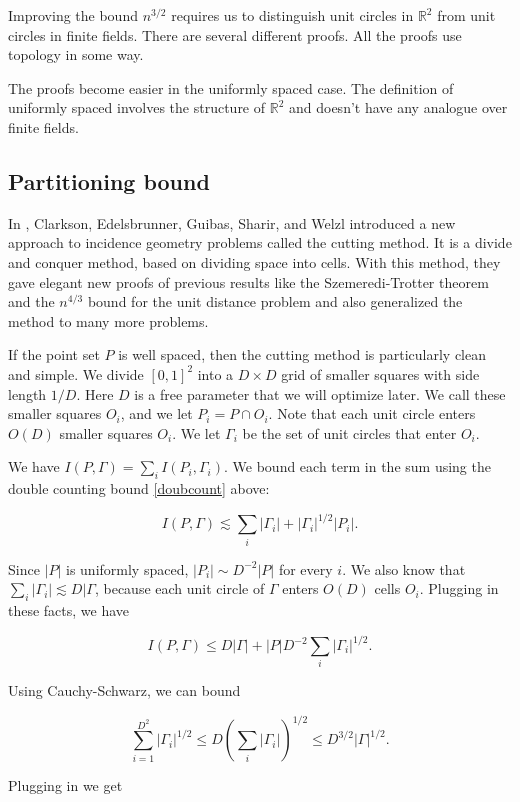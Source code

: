 \documentclass{amsart}
\newcommand{\RR}{\mathbb{R}}
\begin{document}
Improving the bound $n^{3/2}$ requires us to distinguish unit circles in $\RR^2$ from unit circles in finite fields.   There are several different proofs.   All the proofs use topology in some way.

The proofs become easier in the uniformly spaced case.   The definition of uniformly spaced involves the structure of $\RR^2$ and doesn't have any analogue over finite fields.  

\subsection{Partitioning bound} \label{subsecpart}

In \cite{CEGSW},  Clarkson,  Edelsbrunner, Guibas, Sharir, and Welzl introduced a new approach to incidence geometry problems called the cutting method.  It is a divide and conquer method,  based on dividing space into cells.   With this method,  they gave elegant new proofs of previous results like the Szemeredi-Trotter theorem and the $n^{4/3}$ bound for the unit distance problem and also generalized the method to many more problems.

If the point set $P$ is well spaced,  then the cutting method is particularly clean and simple.   We divide $[0,1]^2$ into a $D \times D$ grid of smaller squares with side length $1/D$.   Here $D$ is  a free parameter that we will optimize later.  We call these smaller squares $O_i$,  and we let $P_i = P \cap O_i$.   Note that each unit circle enters $O(D)$ smaller squares $O_i$.   We let $\Gamma_i$ be the set of unit circles that enter $O_i$.

We have $I(P, \Gamma) = \sum_i I(P_i,  \Gamma_i)$.   We bound each term in the sum using the double counting bound \ref{doubcount} above:

$$ I(P, \Gamma) \lesssim \sum_i |\Gamma_i| + |\Gamma_i|^{1/2} |P_i|. $$

Since $|P|$ is uniformly spaced,  $ |P_i| \sim D^{-2} |P|$ for every $i$.   We also know that $\sum_i |\Gamma_i| \lesssim D |\Gamma$,  because each unit circle of $\Gamma$ enters $O(D)$ cells $O_i$.    Plugging in these facts,  we have

$$ I(P, \Gamma) \le D |\Gamma| + |P| D^{-2} \sum_i |\Gamma_i|^{1/2}. $$

Using Cauchy-Schwarz,  we can bound

$$ \sum_{i = 1}^{D^2} |\Gamma_i|^{1/2} \le D \left( \sum_{i} |\Gamma_i| \right)^{1/2} \le D^{3/2} |\Gamma|^{1/2}. $$

Plugging in we get
\end{document}
